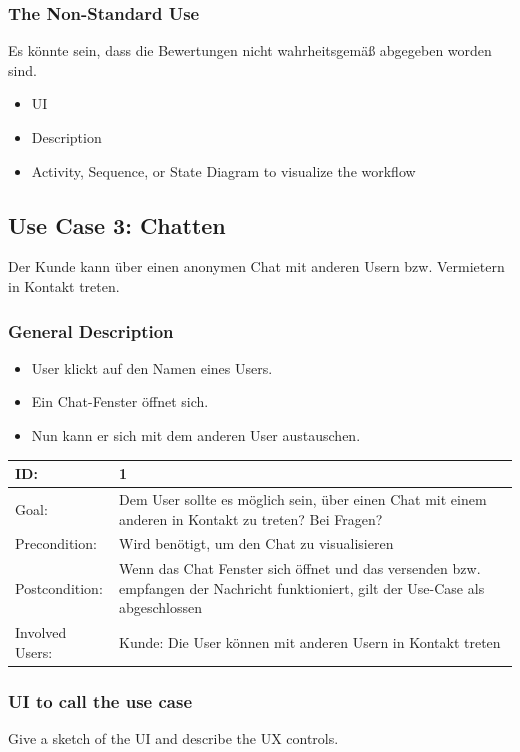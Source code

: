 \documentclass[12pt]{article}
\theoremstyle{definition}
\begin{document}
\subsubsection{The Non-Standard Use}
Es könnte sein, dass die Bewertungen nicht wahrheitsgemäß abgegeben worden sind.
\begin{itemize}
	\item UI
	\item Description
	\item Activity, Sequence, or State Diagram to visualize the workflow
\end{itemize}
\pagebreak

\subsection{Use Case 3: Chatten}
Der Kunde kann über einen anonymen Chat mit anderen Usern bzw. Vermietern in Kontakt treten.
\subsubsection{General Description}
	\begin{itemize}
		\item User klickt auf den Namen eines Users.
		\item Ein Chat-Fenster öffnet sich.
		\item Nun kann er sich mit dem anderen User austauschen.
	\end{itemize}

\begin{tabular}{|p{.2\linewidth}|p{.65\linewidth}|}
\hline 
ID: & 1 \\ \hline
Goal: & Dem User sollte es möglich sein, über einen Chat mit einem anderen in Kontakt zu treten? Bei Fragen? \\ \hline
Precondition: & Wird benötigt, um den Chat zu visualisieren \\ \hline
Postcondition: & Wenn das Chat Fenster sich öffnet und das versenden bzw. empfangen der Nachricht funktioniert, gilt der Use-Case als abgeschlossen \\ \hline
Involved Users: &Kunde: Die User können mit anderen Usern in Kontakt treten \\ \hline
\end{tabular}

\subsubsection{UI to call the use case}
Give a sketch of the UI and describe the UX controls.
\end{document}
